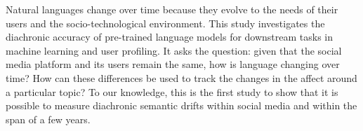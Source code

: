 Natural languages change over time because they evolve to the needs of their users and the socio-technological environment. This study investigates the diachronic accuracy of pre-trained language models for downstream tasks in machine learning and user profiling. It asks the question: given that the social media platform and its users remain the same, how is language changing over time? How can these differences be used to track the changes in the affect around a particular topic? To our knowledge, this is the first study to show that it is possible to measure diachronic semantic drifts within social media and within the span of a few years.
